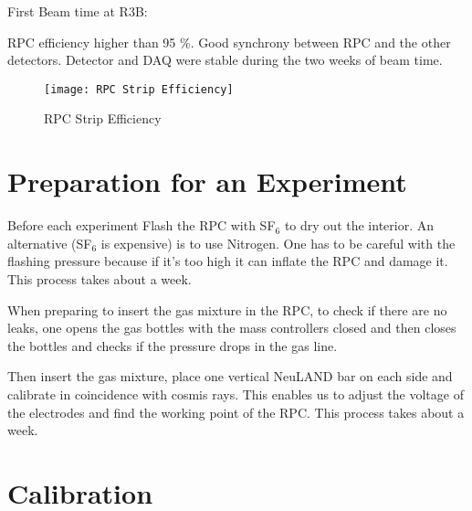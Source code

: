 First Beam time at R3B:

RPC eﬃciency higher than 95 \%.
Good synchrony between RPC and the other detectors.
Detector and DAQ were stable during the two weeks of beam time.

\begin{figure}
	\texttt{[image: RPC Strip Efficiency]}
	\caption{RPC Strip Efficiency}
	\label{fig:RPCStripEff}
\end{figure}


\section{Preparation for an Experiment}


Before each experiment
Flash the RPC with SF$_6$ to dry out the interior. An alternative (SF$_6$ is expensive) is to use Nitrogen. One has to be careful with the flashing pressure because if it's too high it can inflate the RPC and damage it.
This process takes about a week.

When preparing to insert the gas mixture in the RPC, to check if there are no leaks, one opens the gas bottles with the mass controllers closed and then closes the bottles and checks if the pressure drops in the gas line.

Then insert the gas mixture, place one vertical NeuLAND bar on each side and calibrate in coincidence with cosmis rays. This enables us to adjust the voltage of the electrodes and find the working point of the RPC.
This process takes about a week.


\section{Calibration}